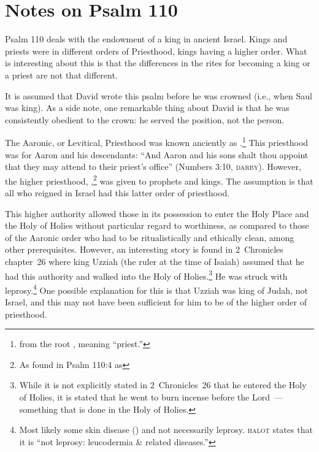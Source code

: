 \section{Notes on Psalm 110}\label{app:psalm-110}
Psalm 110 deals with the endowment of a king in ancient Israel. Kings and priests were in different orders of Priesthood, kings having a higher order. What is interesting about this is that the differences in the rites for becoming a king or a priest are not that different.

It is assumed that David wrote this psalm before he was crowned (i.e., when Saul was king). As a side note, one remarkable thing about David is that he was consistently obedient to the crown: he served the position, not the person.

The Aaronic, or Levitical, Priesthood was known anciently as .\footnote{from the root , meaning ``priest.''} This priesthood was for Aaron and his descendants: ``And Aaron and his sons shalt thou appoint that they may attend to their priest's office'' (Numbers 3:10, \textsc{darby}). However, the higher priesthood, ,\footnote{As found in Psalm 110:4 as } was given to prophets and kings. The assumption is that all who reigned in Israel had this latter order of priesthood.

This higher authority allowed those in its possession to enter the Holy Place and the Holy of Holies without particular regard to worthiness, as compared to those of the Aaronic order who had to be ritualistically and ethically clean, among other prerequisites. However, an interesting story is found in 2~Chronicles chapter~26 where king Uzziah (the ruler at the time of Isaiah) assumed that he had this authority and walked into the Holy of Holies.\footnote{While it is not explicitly stated in 2~Chronicles~26 that he entered the Holy of Holies, it is stated that he went to burn incense before the Lord~--- something that is done in the Holy of Holies.} He was struck with leprosy.\footnote{Most likely some skin disease () and not necessarily leprosy. \textsc{halot} states that it is ``not leprosy: leucodermia \& related diseases.''} One possible explanation for this is that Uzziah was king of Judah, not Israel, and this may not have been sufficient for him to be of the higher order of priesthood.
